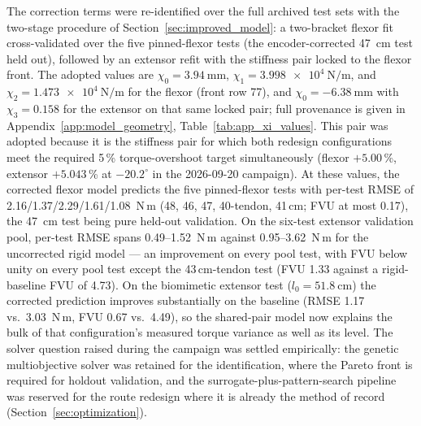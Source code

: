 The correction terms were re-identified over the full archived test sets with the two-stage procedure of Section~\ref{sec:improved_model}: a two-bracket flexor fit cross-validated over the five pinned-flexor tests (the encoder-corrected \qty{47}{\cm} test held out), followed by an extensor refit with the stiffness pair locked to the flexor front. The adopted values are $\chi_{0} = \qty{+3.94}{\mm}$, $\chi_{1} = \qty{3.998e4}{\N\per\m}$, and $\chi_{2} = \qty{1.473e4}{\N\per\m}$ for the flexor (front row 77), and $\chi_{0} = \qty{-6.38}{\mm}$ with $\chi_{3} = 0.158$ for the extensor on that same locked pair; full provenance is given in Appendix~\ref{app:model_geometry}, Table~\ref{tab:app_xi_values}. This pair was adopted because it is the stiffness pair for which both redesign configurations meet the required 5\,\% torque-overshoot target simultaneously (flexor $+5.00$\,\%, extensor $+5.043$\,\% at $-20.2^{\circ}$ in the 2026-09-20 campaign). At these values, the corrected flexor model predicts the five pinned-flexor tests with per-test RMSE of 2.16/1.37/2.29/1.61/1.08~N{\,}m (48, 46, 47, 40-tendon, 41\,cm; FVU at most 0.17), the \qty{47}{\cm} test being pure held-out validation. On the six-test extensor validation pool, per-test RMSE spans 0.49--1.52~N{\,}m against 0.95--3.62~N{\,}m for the uncorrected rigid model --- an improvement on every pool test, with FVU below unity on every pool test except the 43\,cm-tendon test (FVU 1.33 against a rigid-baseline FVU of 4.73). On the biomimetic extensor test ($l_{0} = \qty{51.8}{\cm}$) the corrected prediction improves substantially on the baseline (RMSE 1.17 vs.\ 3.03~N{\,}m, FVU 0.67 vs.\ 4.49), so the shared-pair model now explains the bulk of that configuration's measured torque variance as well as its level. The solver question raised during the campaign was settled empirically: the genetic multiobjective solver was retained for the identification, where the Pareto front is required for holdout validation, and the surrogate-plus-pattern-search pipeline was reserved for the route redesign where it is already the method of record (Section~\ref{sec:optimization}).

